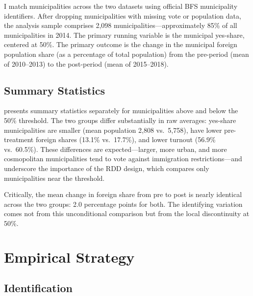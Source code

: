 \documentclass[12pt]{article}
\begin{document}
I match municipalities across the two datasets using official BFS municipality identifiers. After dropping municipalities with missing vote or population data, the analysis sample comprises 2,098 municipalities---approximately 85\% of all municipalities in 2014. The primary running variable is the municipal yes-share, centered at 50\%. The primary outcome is the change in the municipal foreign population share (as a percentage of total population) from the pre-period (mean of 2010--2013) to the post-period (mean of 2015--2018).

\subsection{Summary Statistics}

 presents summary statistics separately for municipalities above and below the 50\% threshold. The two groups differ substantially in raw averages: yes-share municipalities are smaller (mean population 2,808 vs.\ 5,758), have lower pre-treatment foreign shares (13.1\% vs.\ 17.7\%), and lower turnout (56.9\% vs.\ 60.5\%). These differences are expected---larger, more urban, and more cosmopolitan municipalities tend to vote against immigration restrictions---and underscore the importance of the RDD design, which compares only municipalities near the threshold.

Critically, the mean change in foreign share from pre to post is nearly identical across the two groups: 2.0 percentage points for both. The identifying variation comes not from this unconditional comparison but from the local discontinuity at 50\%.




\section{Empirical Strategy}

\subsection{Identification}
\end{document}

